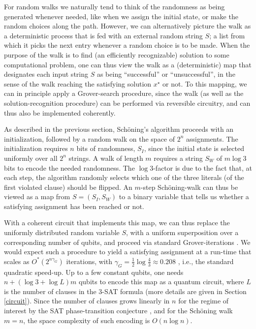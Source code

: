 \documentclass[a4paper,aps,floatfix]{revtex4}
\begin{document}
For random walks we naturally tend to think of the randomness as being generated whenever needed, like when we assign the initial state, or make the random choices along the path.
However, we can alternatively picture the walk as a deterministic process that is fed with an external random string $S$; a list from which it picks the next entry whenever a random choice is to be made. 
When the purpose of the walk is to find (an efficiently recognizable) solution to some computational problem, one can thus view the walk as a (deterministic) map that designates each input string $S$ as being ``successful'' or ``unsuccessful'', in the sense of the walk reaching the satisfying solution $x^\star$ or not. 
To this mapping, we can in principle apply a Grover-search procedure, since the walk (as well as the solution-recognition procedure) can be performed via reversible circuitry, and can thus also be implemented coherently. 

As described in the previous section, Sch\"oning's algorithm proceeds with an initialization, followed by a random walk on the space of $2^n$ assignments. 
The initialization requires $n$ bits of randomness, $S_I$, since the initial state is selected uniformly over all $2^n$ strings. 
A walk of length $m$ requires a string $S_W$ of $m\log3$ bits to encode the needed randomness. 
The $\log3$-factor is due to the fact that, at each step, the algorithm randomly selects which one of the three literals (of the first violated clause) should be flipped. 
An $m$-step Sch\"oning-walk can thus be viewed as a map from $S = (S_I,S_W)$ to a binary variable that tells us whether a satisfying assignment has been reached or not.

With a coherent circuit that implements this map, we can thus replace the uniformly distributed random variable $S$, with a uniform superposition over a corresponding number of qubits, and proceed via standard Grover-iterations \cite{Grover96}. 
We would expect such a procedure to yield a satisfying assignment at a run-time that scales as $O^{*}(2^{n{\gamma_G}})$ iterations, with $\gamma_G = \frac{1}{2}\log\frac{4}{3}\approx 0.208$ \cite{Ambainis04}, i.e., the standard quadratic speed-up. 
Up to a few constant qubits, one needs $n + (\log3 + \log L)m$ qubits to encode this map as a quantum circuit, where $L$ is the number of clauses in the $3$-SAT formula (more details are given in Section \ref{circuit}). Since the number of clauses grows linearly in $n$ for the regime of interest by the SAT phase-transition conjecture \cite{SATtransition}, and for the Sch\"oning walk $m = n$, the space complexity of such encoding is $O(n\log n)$.
\end{document}
